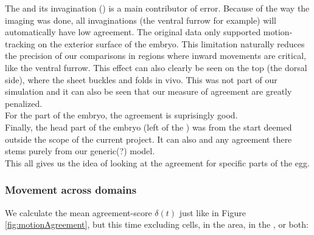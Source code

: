 The  and its invagination () is a main contributor of error. Because of the way the imaging was done, all invaginations (the ventral furrow for example) will automatically have low agreement. The original data only supported motion-tracking on the exterior surface of the embryo.  This limitation naturally reduces the precision of our comparisons in regions where inward movements are critical, like the ventral furrow. This effect can also clearly be seen on the top (the dorsal side), where the sheet buckles and folds in vivo. This was not part of our simulation and it can also be seen that our measure of agreement are greatly penalized.\\

For the  part of the embryo, the agreement is suprisingly good. \\


Finally, the head part of the embryo (left of the ) was from the start deemed outside the scope of the current project. It can also  and any agreement there stems purely from our generic(?) model.\\



This all gives us the idea of looking at the agreement for specific parts of the egg.

\subsubsection{Movement across domains}

We calculate the mean agreement-score $\delta(t)$ just like in Figure \ref{fig:motionAgreement}, but this time excluding cells, in the  area, in the , or both:



